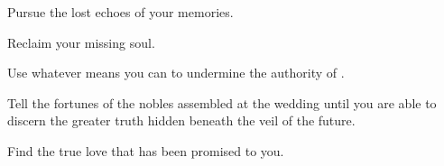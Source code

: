 \documentclass[char]{Kos}
\begin{document}
\begin{itemz}[Goals]
\item Pursue the lost echoes of your memories.
\item Reclaim your missing soul.
\item Use whatever means you can to undermine the authority of \cEtruriaKing{\Monarch} \cEtruriaKing{}.
\item Tell the fortunes of the nobles assembled at the wedding until you are able to discern the greater truth hidden beneath the veil of the future.
\item Find the true love that has been promised to you.
\end{itemz}
\end{document}
